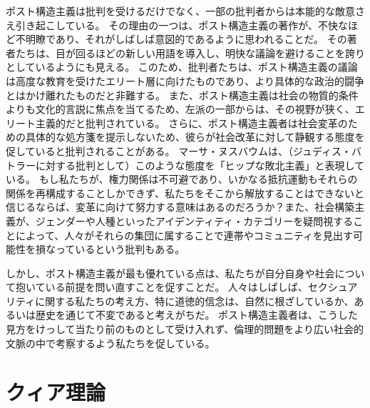 \documentclass[paper=a4,book,openany]{jlreq}
\begin{document}
ポスト構造主義は批判を受けるだけでなく、一部の批判者からは本能的な敵意さえ引き起こしている。
その理由の一つは、ポスト構造主義の著作が、不快なほど不明瞭であり、それがしばしば意図的であるように思われることだ。
その著者たちは、目が回るほどの新しい用語を導入し、明快な議論を避けることを誇りとしているようにも見える。
このため、批判者たちは、ポスト構造主義の議論は高度な教育を受けたエリート層に向けたものであり、より具体的な政治的闘争とはかけ離れたものだと非難する。
また、ポスト構造主義は社会の物質的条件よりも文化的言説に焦点を当てるため、左派の一部からは、その視野が狭く、エリート主義的だと批判されている。
さらに、ポスト構造主義者は社会変革のための具体的な処方箋を提示しないため、彼らが社会改革に対して静観する態度を促していると批判されることがある。
マーサ・ヌスバウムは、（ジュディス・バトラーに対する批判として）このような態度を「ヒップな敗北主義」と表現している\citep{nussbaum99:_profes_of_parody}。
もし私たちが、権力関係は不可避であり、いかなる抵抗運動もそれらの関係を再構成することしかできず、私たちをそこから解放することはできないと信じるならば、変革に向けて努力する意味はあるのだろうか？また、社会構築主義が、ジェンダーや人種といったアイデンティティ・カテゴリーを疑問視することによって、人々がそれらの集団に属することで連帯やコミュニティを見出す可能性を損なっているという批判もある。

しかし、ポスト構造主義が最も優れている点は、私たちが自分自身や社会について抱いている前提を問い直すことを促すことだ。
人々はしばしば、セクシュアリティに関する私たちの考え方、特に道徳的信念は、自然に根ざしているか、あるいは歴史を通じて不変であると考えがちだ。
ポスト構造主義者は、こうした見方をけっして当たり前のものとして受け入れず、倫理的問題をより広い社会的文脈の中で考察するよう私たちを促している。

\section{クィア理論}
\end{document}
